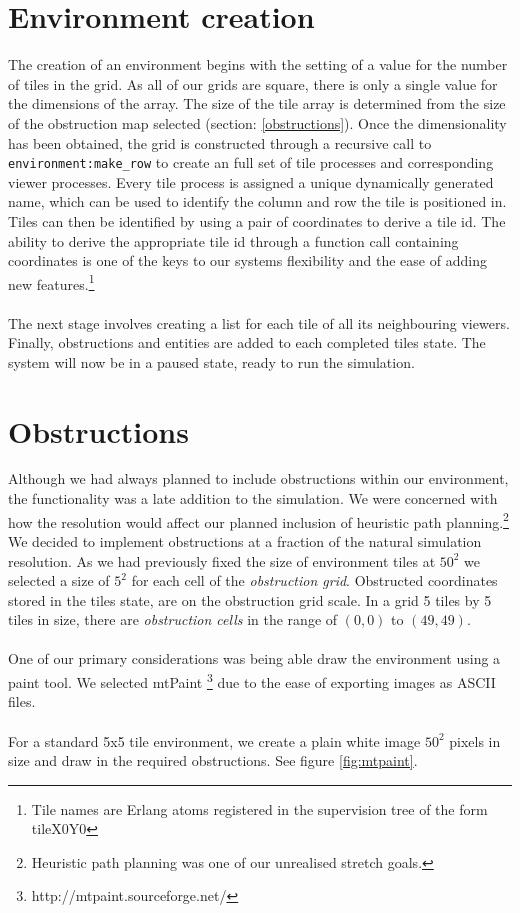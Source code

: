 \documentclass[10pt, a4paper, conference, compsocconf]{IEEEtran}
\begin{document}
\section{Environment creation \label{environment_creation}}
The creation of an environment begins with the setting of a value for the number of tiles in the grid. As all of our grids are square, there is only a single value for the dimensions of the array. The size of the tile array is determined from the size of the obstruction map selected (section: \ref{obstructions}). Once the dimensionality has been obtained, the grid is constructed through a recursive call to \verb+environment:make_row+ to create an full set of tile processes and corresponding viewer processes. Every tile process is assigned a unique dynamically generated name, which can be used to identify the column and row the tile is positioned in. Tiles can then be identified by using a pair of coordinates to derive a tile id. The ability to derive the appropriate tile id through a function call containing coordinates is one of the keys to our systems flexibility and the ease of adding new features.\footnote{Tile names are Erlang atoms registered in the supervision tree of the form tileX0Y0}\\
\\
The next stage involves creating a list for each tile of all its neighbouring viewers. Finally, obstructions and entities are added to each completed tiles state. The system will now be in a paused state, ready to run the simulation.\\

\section{Obstructions \label{obstructions}}
Although we had always planned to include obstructions within our environment, the functionality was a late addition to the simulation. We were concerned with how the resolution would affect our planned inclusion of heuristic path planning.\footnote{Heuristic path planning was one of our unrealised stretch goals.} We decided to implement obstructions at a fraction of the natural simulation resolution. As we had previously fixed the size of environment tiles at \(50^2\) we selected a size of \(5^2\) for each cell of the \emph{obstruction grid}. Obstructed coordinates stored in the tiles state, are on the obstruction grid scale. In a grid 5 tiles by 5 tiles in size, there are \emph{obstruction cells} in the range of \( (0,0) \) to \( (49,49) \).\\
\\
One of our primary considerations was being able draw the environment using a paint tool. We selected mtPaint \footnote{http://mtpaint.sourceforge.net/} due to the ease of exporting images as ASCII files.\\
\\
For a standard 5x5 tile environment, we create a plain white image \(50^2\) pixels in size and draw in the required obstructions. See figure \ref{fig:mtpaint}.\\
\end{document}
